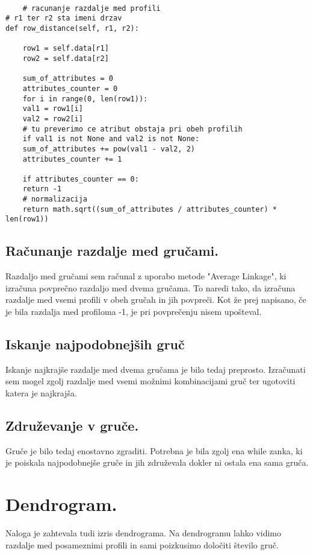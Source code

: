 \documentclass[a4paper,11pt]{article}
\begin{document}
\newpage
\begin{lstlisting}

    # racunanje razdalje med profili
# r1 ter r2 sta imeni drzav
def row_distance(self, r1, r2):

    row1 = self.data[r1]
    row2 = self.data[r2]

    sum_of_attributes = 0
    attributes_counter = 0
    for i in range(0, len(row1)):
    val1 = row1[i]
    val2 = row2[i]
    # tu preverimo ce atribut obstaja pri obeh profilih
    if val1 is not None and val2 is not None:
    sum_of_attributes += pow(val1 - val2, 2)
    attributes_counter += 1

    if attributes_counter == 0:
    return -1
    # normalizacija
    return math.sqrt((sum_of_attributes / attributes_counter) * len(row1))

\end{lstlisting}

\subsection{Računanje razdalje med gručami.}
Razdaljo med gručami sem računal z uporabo metode "Average Linkage", ki izračuna povprečno razdaljo med dvema gručama. To naredi tako, da izračuna razdalje med vsemi profili v obeh gručah in jih povpreči. Kot že prej napisano, če je bila razdalja med profiloma -1, je pri povprečenju nisem upošteval.

\subsection{Iskanje najpodobnejših gruč}
Iskanje najkrajše razdalje med dvema gručama je bilo tedaj preprosto. Izračunati sem mogel zgolj razdalje med vsemi možnimi kombinacijami gruč ter ugotoviti katera je najkrajša.

\subsection{Združevanje v gruče.}
Gruče je bilo tedaj enostavno zgraditi. Potrebna je bila zgolj ena while zanka, ki je poiskala najpodobnejše gruče in jih združevala dokler ni ostala ena sama gruča.

\section{Dendrogram.}
Naloga je zahtevala tudi izris dendrograma. Na dendrogramu lahko vidimo razdalje med posameznimi profili in sami poizkusimo določiti število gruč.
\end{document}
